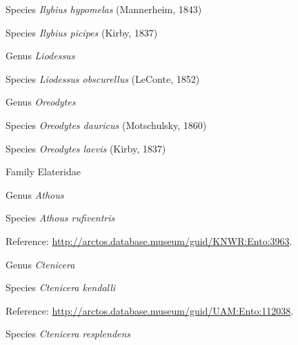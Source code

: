 \documentclass[9pt, article]{memoir}
\begin{document}
\begin{multicols}{2}
\vspace{6pt}\noindent\hspace{36pt}Species \textit{Ilybius hypomelas} (Mannerheim, 1843)


\vspace{6pt}\noindent\hspace{36pt}Species \textit{Ilybius picipes} (Kirby, 1837)


\vspace{6pt}\noindent\hspace{30pt}Genus \textit{Liodessus}


\vspace{6pt}\noindent\hspace{36pt}Species \textit{Liodessus obscurellus} (LeConte, 1852)


\vspace{6pt}\noindent\hspace{30pt}Genus \textit{Oreodytes}


\vspace{6pt}\noindent\hspace{36pt}Species \textit{Oreodytes dauricus} (Motschulsky, 1860)


\vspace{6pt}\noindent\hspace{36pt}Species \textit{Oreodytes laevis} (Kirby, 1837)


\vspace{6pt}\noindent\hspace{24pt}Family Elateridae


\vspace{6pt}\noindent\hspace{30pt}Genus \textit{Athous}


\vspace{6pt}\noindent\hspace{36pt}Species \textit{Athous rufiventris}


Reference: 
\url{http://arctos.database.museum/guid/KNWR:Ento:3963}.

\vspace{6pt}\noindent\hspace{30pt}Genus \textit{Ctenicera}


\vspace{6pt}\noindent\hspace{36pt}Species \textit{Ctenicera kendalli}


Reference: 
\url{http://arctos.database.museum/guid/UAM:Ento:112038}.

\vspace{6pt}\noindent\hspace{36pt}Species \textit{Ctenicera resplendens}



\end{multicols}
\end{document}
